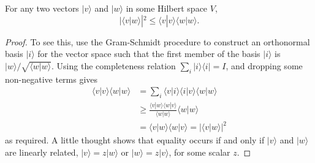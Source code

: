 

\begin{theorem}
    For any two vectors $|v\rangle$ and $|w\rangle$ in some Hilbert space $V$,
$$
|\langle v | w\rangle|^{2} \leq\langle v | v\rangle\langle w | w\rangle.
$$
\end{theorem}
\begin{proof}
    To see this, use the Gram-Schmidt procedure to construct an orthonormal basis $|i\rangle$ for the vector space such that the first member of the basis $|i\rangle$ is $|w\rangle / \sqrt{\langle w | w\rangle}$. Using the completeness relation $\sum_{i}|i\rangle\langle i|=I$, and dropping some non-negative terms gives
$$
\begin{aligned}
\langle v | v\rangle\langle w | w\rangle & =\sum_{i}\langle v | i\rangle\langle i | v\rangle\langle w | w\rangle \\
& \geq \frac{\langle v | w\rangle\langle w | v\rangle}{\langle w | w\rangle}\langle w | w\rangle \\
& =\langle v | w\rangle\langle w | v\rangle=|\langle v | w\rangle|^{2}
\end{aligned}
$$
as required. A little thought shows that equality occurs if and only if $|v\rangle$ and $|w\rangle$ are linearly related, $|v\rangle=z|w\rangle$ or $|w\rangle=z|v\rangle$, for some scalar $z$.
\end{proof}